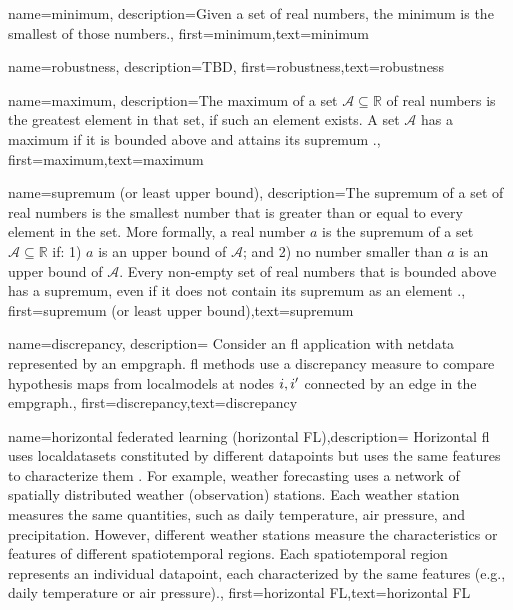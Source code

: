 
{
	name=minimum,
	description={Given a set of real numbers, the minimum is the smallest of those numbers.},
	first={minimum},text={minimum}
}

{name=robustness,
     description={TBD},
 first={robustness},text={robustness}
}

{name=maximum,
     description={The maximum of a set $\mathcal{A} \subseteq \mathbb{R}$ 
     	of real numbers is the greatest element in that set, if such an element exists. A set $\mathcal{A}$ 
     	has a maximum if it is bounded above and attains its \gls{supremum} \cite[Sec.~1.4]{RudinBookPrinciplesMatheAnalysis}.},
 first={maximum},text={maximum}
}

{name=supremum (or least upper bound),
	description={The supremum of a set of real numbers is 
		the smallest number that is greater than or equal to every element in the set. More formally, a 
		real number $a$ is the supremum of a set $\mathcal{A} \subseteq \mathbb{R}$ if: 1) $a$ 
		is an upper bound of $\mathcal{A}$; and 2) no number smaller than $a$ is an upper bound of $\mathcal{A}$. 
		Every non-empty set of real numbers that is bounded above has a supremum, even if it does 
		not contain its supremum as an element \cite[Sec.~1.4]{RudinBookPrinciplesMatheAnalysis}.},
	first={supremum (or least upper bound)},text={supremum}
}

{name=discrepancy,
	description={
		Consider an \gls{fl} application with \gls{netdata} 
		represented by an \gls{empgraph}. \gls{fl} methods use a discrepancy measure 
		to compare \gls{hypothesis} maps from \gls{localmodel}s at nodes $i,i'$ 
		connected by an edge in the \gls{empgraph}.},
	first={discrepancy},text={discrepancy}
}



{name={horizontal federated learning (horizontal FL)},description=
	{Horizontal \gls{fl} uses \gls{localdataset}s constituted by different
	   \gls{datapoint}s but uses the same \gls{feature}s to characterize them \cite{HFLChapter2020}.
		For example, weather forecasting uses a network of spatially distributed
		weather (observation) stations. Each weather station measures the
		same quantities, such as daily temperature, air pressure, and precipitation.
		However, different weather stations measure the characteristics or
		\gls{feature}s of different spatiotemporal regions. Each spatiotemporal region 
		represents an individual \gls{datapoint}, each characterized by the same \gls{feature}s 
		(e.g., daily temperature or air pressure).},
	first={horizontal FL},text={horizontal FL}
} 

